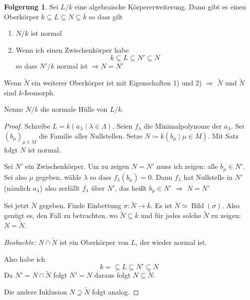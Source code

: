 \documentclass[12pt,parskip=full]{scrartcl}
\theoremstyle{definition}
\newtheorem{corollary}[theorem]{Folgerung}
\theoremstyle{remark}
\begin{document}
	\begin{corollary}
		Sei $L/k$ eine algebraische Körpererweiterung. Dann gibt es einen Oberkörper $k \subseteq L \subseteq N \subseteq \overline{k}$ so dass gilt
		\begin{enumerate}
			\item $N/k$ ist normal
			\item Wenn ich einen Zwischenkörper habe
			\begin{equation*}
				k \subseteq L \subseteq N' \subseteq N
			\end{equation*}
			so dass $N'/k$ normal ist $\Rightarrow N = N'$
		\end{enumerate}
		Wenn $\tilde{N}$ ein weiterer Oberkörper ist mit Eigenschaften 1) und 2) $\Rightarrow$ $\tilde{N}$ und $\tilde{N}$ sind $k$-Isomorph.
		
		Nenne $N/k$ die normale Hülle von $L/k$.
	\end{corollary}

	\begin{proof}
		Schreibe $L = k(a_\lambda \mid \lambda \in \Lambda)$. Seien $f_\lambda$ die Minimalpolynome der $a_\lambda$. Sei $(b_\mu)_{\mu \in M}$ die Familie aller Nullstellen. Setze $N \coloneqq k(b_\mu \mid \mu \in M)$. Mit Satz folgt $N$ ist normal.
		
		Sei $N'$ ein Zwischenkörper. Um zu zeigen $N = N'$ muss ich zeigen: alle $b_\mu \in N'$. Sei also $\mu$ gegeben, wähle $\lambda$ so dass $f_\lambda(b_\mu) = 0$. Dann $f_\lambda$ hat Nullstelle in $N'$ (nämlich $a_\lambda$) also zerfällt $f_\lambda$ über $N'$, das heißt $b_\mu \in N'$ $\Rightarrow$ $N = N'$
		
		Sei jetzt $\tilde{N}$ gegeben. Finde Einbettung $\sigma: \tilde{N} \to \overline{k}$. Es ist $\tilde{N} \simeq \operatorname{Bild}(\sigma)$. Also genügt es, den Fall zu betrachten, wo $\tilde{N} \subseteq \overline{k}$ und für jedes solche $\tilde{N}$ zu zeigen: $N = \tilde{N}$.
		
		\textit{Beobachte:} $N \cap \tilde{N}$ ist ein Oberkörper von $L$, der wieder normal ist.
		
		Also habe ich
		\begin{equation*}
			k = \subseteq L \subseteq N' \subseteq N
		\end{equation*}
		Da $N' = N \cap \tilde{N}$ folgt $N' = N$ daraus folgt $N \subseteq \tilde{N}$.
		
		Die andere Inklusion $N \supseteq \tilde{N}$ folgt analog.
	\end{proof}
\end{document}
